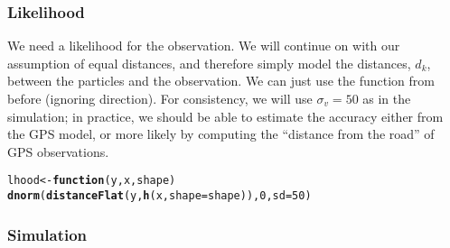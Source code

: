 \documentclass[11pt]{article}\usepackage[]{graphicx}\usepackage[]{color}
\makeatletter
\newcommand{\hlnum}[1]{\textcolor[rgb]{0.686,0.059,0.569}{#1}}%
\newcommand{\hlstd}[1]{\textcolor[rgb]{0.345,0.345,0.345}{#1}}%
\newcommand{\hlkwa}[1]{\textcolor[rgb]{0.161,0.373,0.58}{\textbf{#1}}}%
\newcommand{\hlkwb}[1]{\textcolor[rgb]{0.69,0.353,0.396}{#1}}%
\newcommand{\hlkwc}[1]{\textcolor[rgb]{0.333,0.667,0.333}{#1}}%
\newcommand{\hlkwd}[1]{\textcolor[rgb]{0.737,0.353,0.396}{\textbf{#1}}}%
\newenvironment{kframe}{%
 \def\at@end@of@kframe{}%
 \ifinner\ifhmode%
  \def\at@end@of@kframe{\end{minipage}}%
  \begin{minipage}{\columnwidth}%
 \fi\fi%
 \def\FrameCommand##1{\hskip\@totalleftmargin \hskip-\fboxsep
 \colorbox{shadecolor}{##1}\hskip-\fboxsep
     \hskip-\linewidth \hskip-\@totalleftmargin \hskip\columnwidth}%
 \MakeFramed {\advance\hsize-\width
   \@totalleftmargin\z@ \linewidth\hsize
   \@setminipage}}%
 {\par\unskip\endMakeFramed%
 \at@end@of@kframe}
\newenvironment{knitrout}{}{} %
\makeatother
\begin{document}
\subsubsection{Likelihood}

We need a likelihood for the observation. We will continue on with our assumption of equal distances,
and therefore simply model the distances, $d_k$, between the particles and the observation.
We can just use the function from before (ignoring direction).
For consistency, we will use $\sigma_v = 50$ as in the simulation;
in practice, we should be able to estimate the accuracy either from the GPS model,
or more likely by computing the ``distance from the road'' of GPS observations.
\begin{knitrout}
\color{fgcolor}\begin{kframe}
\begin{alltt}
\hlstd{lhood} \hlkwb{<-} \hlkwa{function}\hlstd{(}\hlkwc{y}\hlstd{,} \hlkwc{x}\hlstd{,} \hlkwc{shape}\hlstd{)}
    \hlkwd{dnorm}\hlstd{(}\hlkwd{distanceFlat}\hlstd{(y,} \hlkwd{h}\hlstd{(x,} \hlkwc{shape} \hlstd{= shape)),} \hlnum{0}\hlstd{,} \hlkwc{sd} \hlstd{=} \hlnum{50}\hlstd{)}
\end{alltt}
\end{kframe}
\end{knitrout}


\subsubsection{Simulation}
\end{document}
